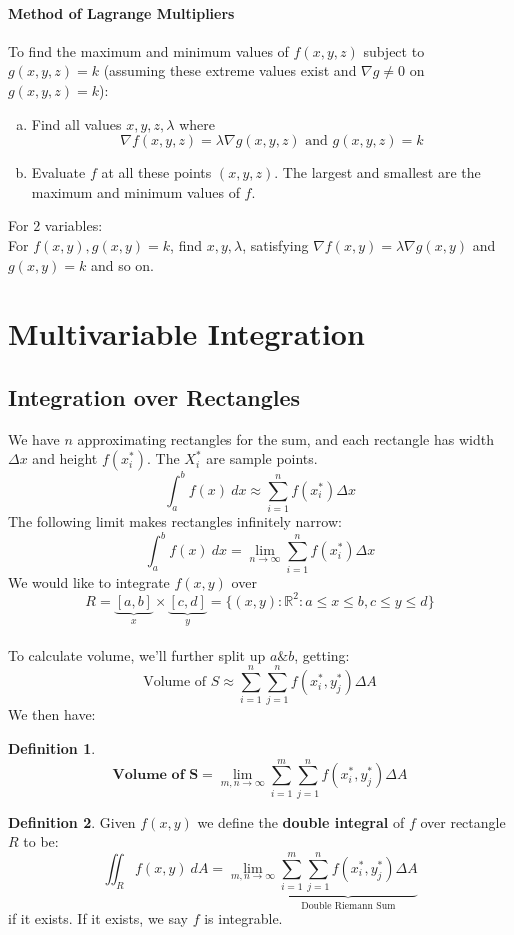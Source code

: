 \documentclass[12 pt]{article}
\theoremstyle{definition}
\newtheorem{defn}{Definition}
\begin{document}
\paragraph{Method of Lagrange Multipliers}
To find the maximum and minimum values of $f(x,y,z)$ subject to $g(x,y,z)=k$ (assuming these extreme values exist and $\nabla g \neq 0$ on $g(x,y,z)=k$):
\begin{enumerate}[a)]
\item Find all values $x,y,z,\lambda$ where
  $$ \nabla f(x,y,z)=\lambda \nabla g(x,y,z) \text{ and }g(x,y,z)=k$$
  \item Evaluate $f$ at all these points $(x,y,z)$. The largest and smallest are the maximum and minimum values of $f$.
  \end{enumerate}
  For $2$ variables:
  \\ For $f(x,y),g(x,y)=k$, find $x,y,\lambda$, satisfying $\nabla f(x,y)=\lambda \nabla g(x,y)$ and $g(x,y)=k$ and so on.
  \section{Multivariable Integration}
  \subsection{Integration over Rectangles} We have $n$ approximating rectangles for the sum, and each rectangle has width $\Delta x$ and height $f(x_i^*)$. The $X_i^*$ are sample points.
  $$ \int_{a}^{b}f(x)\ dx \approx \sum_{i=1}^n f(x_i^*)\Delta x$$
  The following limit makes rectangles infinitely narrow:
  $$ \int_{a}^{b}f(x)\ dx = \lim_{n\to \infty}\sum_{i=1}^n f(x_i^*)\Delta x$$
  We would like to integrate $f(x,y)$ over $$R=\underbrace{[a,b]}_x \times \underbrace{[c,d]}_y = \{(x,y): \mathbb{R}^2:a\leq x \leq b, c\leq y \leq d\}$$
  \\ To calculate volume, we'll further split up $a \& b$, getting:
  $$ \text{Volume of $S$}\approx \sum_{i=1}^{n}\sum_{j=1}^n f(x_i^*,y_j^*)\Delta A$$
  We then have:
  \begin{defn}
   $$ \textbf{Volume of S} = \lim_{m,n\to \infty} \sum_{i=1}^m \sum_{j=1}^n f(x_i^*,y_j^*)\Delta A$$ 
 \end{defn}
 \begin{defn}
   Given $f(x,y)$ we define the \textbf{double integral} of $f$ over rectangle $R$ to be:
   $$\iint_{R} f(x,y)\ dA = \lim_{m,n\to \infty} \underbrace{\sum_{i=1}^{m}\sum_{j=1}^n f(x_i^*,y_j^*) \Delta A}_{\text{Double Riemann Sum}}$$ if it exists. If it exists, we say $f$ is integrable.
 \end{defn}
\end{document}
